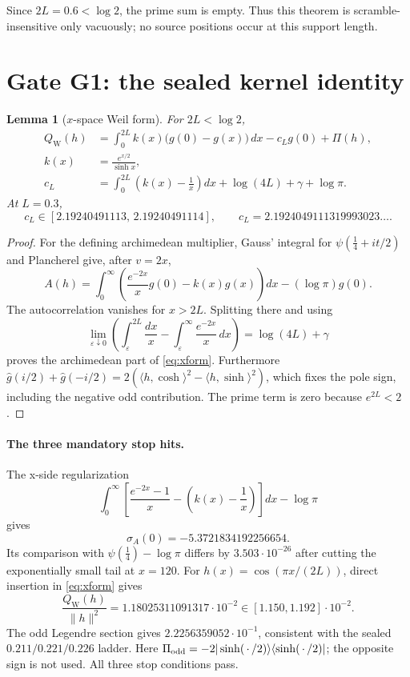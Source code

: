 \documentclass[11pt]{article}
\newtheorem{lemma}{Lemma}
\newcommand{\QW}{Q_{\mathrm W}}
\begin{document}
Since $2L=0.6<\log2$, the prime sum is empty.  Thus this theorem is
scramble-insensitive only vacuously; no source positions occur at
this support length.

\section{Gate G1: the sealed kernel identity}

\begin{lemma}[$x$-space Weil form]
\label{lem:xform}
For $2L<\log2$,
\begin{align}
 \QW(h)
 &=\int_0^{2L} k(x)\bigl(g(0)-g(x)\bigr)\,dx
       -c_Lg(0)+\Pi(h),                                      \label{eq:xform}\\
 k(x)&=\frac{e^{x/2}}{\sinh x},                              \label{eq:k}\\
 c_L&=\int_0^{2L}\left(k(x)-\frac1x\right)dx
       +\log(4L)+\gamma+\log\pi .                            \label{eq:cL}
\end{align}
At $L=0.3$,
\[
 c_L\in[2.19240491113,\,2.19240491114],
 \qquad c_L=2.1924049111319993023\ldots .
\]
\end{lemma}

\begin{proof}
For the defining archimedean multiplier, Gauss' integral for
$\psi(\tfrac14+it/2)$ and Plancherel give, after $v=2x$,
\[
 A(h)=\int_0^\infty
 \left(\frac{e^{-2x}}xg(0)-k(x)g(x)\right)dx
 -(\log\pi)g(0).
\]
The autocorrelation vanishes for $x>2L$.  Splitting there and using
\[
 \lim_{\varepsilon\downarrow0}\left(
 \int_\varepsilon^{2L}\frac{dx}{x}
 -\int_\varepsilon^\infty\frac{e^{-2x}}x\,dx\right)
 =\log(4L)+\gamma
\]
proves the archimedean part of \eqref{eq:xform}.
Furthermore
$\widehat g(i/2)+\widehat g(-i/2)
=2(\langle h,\cosh\rangle^2-\langle h,\sinh\rangle^2)$,
which fixes the pole sign, including the negative odd contribution.
The prime term is zero because $e^{2L}<2$.
\end{proof}

\paragraph{The three mandatory stop hits.}
The x-side regularization
\[
 \int_0^\infty\left[
 \frac{e^{-2x}-1}{x}-\left(k(x)-\frac1x\right)\right]dx-\log\pi
\]
gives
\[
 \sigma_A(0)=-5.3721834192256654.
\]
Its comparison with
$\psi(\tfrac14)-\log\pi$ differs by
$3.503\cdot10^{-26}$ after cutting the exponentially small tail at
$x=120$.  For
$h(x)=\cos(\pi x/(2L))$, direct insertion in \eqref{eq:xform} gives
\[
 \frac{\QW(h)}{\|h\|^2}=1.18025311091317\cdot10^{-2}
 \in[1.150,1.192]\cdot10^{-2}.
\]
The odd Legendre section gives
$2.2256359052\cdot10^{-1}$, consistent with the sealed
$0.211/0.221/0.226$ ladder.  Here
$\Pi_{\rm odd}=-2|\sinh(\,\cdot\,/2)\rangle
\langle\sinh(\,\cdot\,/2)|$; the opposite sign is not used.
All three stop conditions pass.
\end{document}
